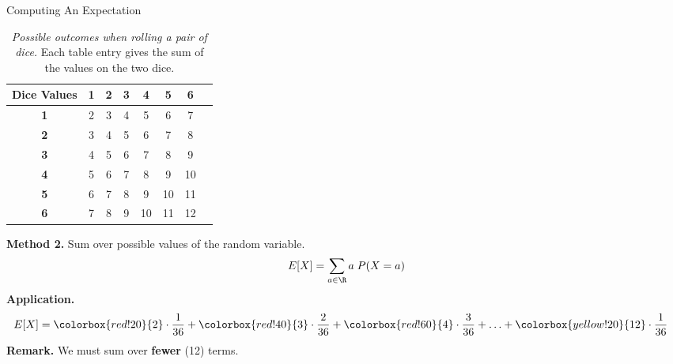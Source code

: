 \documentclass[10pt]{beamer}
\begin{document}
\begin{frame}{Computing An Expectation}
\footnotesize  
\begin{table}
\caption{\textit{Possible outcomes when rolling a pair of dice.} Each table entry gives the sum of the values on the two dice.}	
\begin{tabular}{|c|c|c|c|c|c|c|c|}
\hline
\textbf{Dice Values} & \textbf{1} & \textbf{2} & \textbf{3} & \textbf{4} & \textbf{5} & \textbf{6} \\
\hline
\textbf{1} & \cellcolor{red!20} 2  & \cellcolor{red!40} 3  & \cellcolor{red!60} 4  & \cellcolor{red!80} 5  & \cellcolor{red!90} 6  & \cellcolor{red!100} 7 \\
\hline
\textbf{2} & \cellcolor{red!40} 3  & \cellcolor{red!60} 4  & \cellcolor{red!80} 5  & \cellcolor{red!90} 6  & \cellcolor{red!100} 7  & \cellcolor{orange!80} 8 \\
\hline
\textbf{3} & \cellcolor{red!60} 4  & \cellcolor{red!80} 5  & \cellcolor{red!90} 6  & \cellcolor{red!100} 7  & \cellcolor{orange!80} 8  & \cellcolor{orange!60} 9 \\
\hline
\textbf{4} & \cellcolor{red!80} 5  & \cellcolor{red!90} 6  & \cellcolor{red!100} 7  & \cellcolor{orange!80} 8  & \cellcolor{orange!60} 9  & \cellcolor{orange!40} 10 \\
\hline
\textbf{5} & \cellcolor{red!90} 6  & \cellcolor{red!100} 7  & \cellcolor{orange!80} 8  & \cellcolor{orange!60} 9  & \cellcolor{orange!40} 10 & \cellcolor{orange!20} 11 \\
\hline
\textbf{6} & \cellcolor{red!100} 7 & \cellcolor{orange!80} 8 & \cellcolor{orange!60} 9 & \cellcolor{orange!40} 10 & \cellcolor{orange!20} 11 & \cellcolor{yellow!20} 12 \\
\hline
\end{tabular}
\end{table}

\vfill 

\colorbox{blue!30}{\textbf{Method 2.}} \;  Sum over possible values of the random variable.
\[ E[X] = \sum_{a \in \R} a \; P(X=a) \]
\vfill 
\pause 
\colorbox{blue!30}{\textbf{Application.}}
\begin{align*}
 E[X] &= \colorbox{red!20}{2} \cdot \frac{1}{36} + \colorbox{red!40}{3} \cdot \frac{2}{36}  +\colorbox{red!60}{4} \cdot \frac{3}{36}  +\hdots + 
  \colorbox{yellow!20}{12} \cdot \frac{1}{36} 
\end{align*}
\vfill 
\pause 
\colorbox{blue!30}{\textbf{Remark.}} \; We must sum over \textbf{fewer} (12) terms.
\end{frame}
\end{document}
